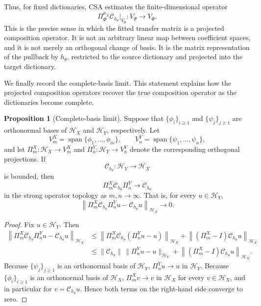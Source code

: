 \documentclass{article}
\theoremstyle{definition}
\newtheorem{proposition}{Proposition}
\begin{document}
Thus, for fixed dictionaries, CSA estimates the finite-dimensional operator
\[
\Pi_\Phi^{\mu_X} \mathcal C_{h_\theta}\big|_{V_\Psi}:V_\Psi\to V_\Phi.
\]
This is the precise sense in which the fitted transfer matrix is a projected composition
operator. It is not an arbitrary linear map between coefficient spaces, and it is not merely
an orthogonal change of basis. It is the matrix representation of the pullback by $h_\theta$,
restricted to the source dictionary and projected into the target dictionary.

We finally record the complete-basis limit. This statement explains how the projected
composition operators recover the true composition operator as the dictionaries become
complete.

\begin{proposition}[Complete-basis limit]
\label{prop:complete_basis_composition_convergence}
Suppose that $\{\phi_i\}_{i\geq1}$ and $\{\psi_j\}_{j\geq1}$ are orthonormal bases of
$\mathcal H_X$ and $\mathcal H_Y$, respectively. Let
\[
V_m^X=\operatorname{span}\{\phi_1,\ldots,\phi_m\},
\qquad
V_n^Y=\operatorname{span}\{\psi_1,\ldots,\psi_n\},
\]
and let $\Pi_m^X:\mathcal H_X\to V_m^X$ and
$\Pi_n^Y:\mathcal H_Y\to V_n^Y$ denote the corresponding orthogonal projections.
If
\[
\mathcal C_{h_\theta}:\mathcal H_Y\to \mathcal H_X
\]
is bounded, then
\[
\Pi_m^X \mathcal C_{h_\theta}\Pi_n^Y
\to
\mathcal C_{h_\theta}
\]
in the strong operator topology as $m,n\to\infty$. That is, for every
$u\in\mathcal H_Y$,
\[
\left\|
\Pi_m^X \mathcal C_{h_\theta}\Pi_n^Y u
-
\mathcal C_{h_\theta}u
\right\|_{\mathcal H_X}
\to 0.
\]
\end{proposition}

\begin{proof}
Fix $u\in\mathcal H_Y$. Then
\[
\begin{aligned}
\left\|
\Pi_m^X \mathcal C_{h_\theta}\Pi_n^Y u
-
\mathcal C_{h_\theta}u
\right\|_{\mathcal H_X}
&\leq
\left\|
\Pi_m^X \mathcal C_{h_\theta}(\Pi_n^Y u-u)
\right\|_{\mathcal H_X}
+
\left\|
(\Pi_m^X-I)\mathcal C_{h_\theta}u
\right\|_{\mathcal H_X} \\
&\leq
\|\mathcal C_{h_\theta}\|\,
\|\Pi_n^Y u-u\|_{\mathcal H_Y}
+
\left\|
(\Pi_m^X-I)\mathcal C_{h_\theta}u
\right\|_{\mathcal H_X}.
\end{aligned}
\]
Because $\{\psi_j\}_{j\geq1}$ is an orthonormal basis of $\mathcal H_Y$,
$\Pi_n^Y u\to u$ in $\mathcal H_Y$. Because $\{\phi_i\}_{i\geq1}$ is an orthonormal
basis of $\mathcal H_X$, $\Pi_m^X v\to v$ in $\mathcal H_X$ for every
$v\in\mathcal H_X$, and in particular for $v=\mathcal C_{h_\theta}u$. Hence both terms on
the right-hand side converge to zero.
\end{proof}
\end{document}
